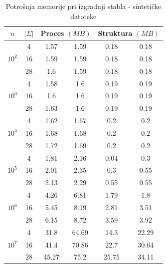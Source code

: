 \documentclass[times, utf8, seminar, numeric]{fer}
\begin{document}
  
\begin{table}[h]
\caption{Potrošnja memorije pri izgradnji stabla - sintetičke datoteke}
\label{table:mem_sin}
\centering
  \begin{tabular}{c|c|c|c|c|c}
    $n$ & $|\Sigma|$ &
    \multicolumn{2}{c|}{Proces $(MB)$} & \multicolumn{2}{c}{Struktura $(MB)$} \\ \hline
    \multirow{3}{*}{$10^2$}
      & \num{4} & \num{1.57} & \num{1.59} & \num{0.18} & \num{0.18} \\
      & \num{16} & \num{1.59} & \num{1.59} & \num{0.18} & \num{0.18} \\
      & \num{28} & \num{1.6} & \num{1.59} & \num{0.18} & \num{0.18} \\
    \hline
    \multirow{3}{*}{$10^3$}
      & \num{4} & \num{1.58} & \num{1.6} & \num{0.19} & \num{0.19} \\
      & \num{16} & \num{1.6} & \num{1.6} & \num{0.19} & \num{0.19} \\
      & \num{28} & \num{1.63} & \num{1.6} & \num{0.19} & \num{0.19} \\
    \hline
    \multirow{3}{*}{$10^4$}
      & \num{4} & \num{1.62} & \num{1.67} & \num{0.2} & \num{0.2} \\
      & \num{16} & \num{1.68} & \num{1.68} & \num{0.2} & \num{0.2} \\
      & \num{28} & \num{1.72} & \num{1.69} & \num{0.2} & \num{0.2} \\
    \hline
    \multirow{3}{*}{$10^5$}
      & \num{4} & \num{1.81} & \num{2.16} & \num{0.04} & \num{0.3} \\
      & \num{16} & \num{2.01} & \num{2.35} & \num{0.3} & \num{0.55} \\
      & \num{28} & \num{2.13} & \num{2.29} & \num{0.55} & \num{0.55} \\
    \hline
    \multirow{3}{*}{$10^6$}
      & \num{4} & \num{4.26} & \num{6.81} & \num{1.79} & \num{1.8} \\
      & \num{16} & \num{5.45} & \num{8.19} & \num{2.81} & \num{3.51} \\
      & \num{28} & \num{6.15} & \num{8.72} & \num{3.59} & \num{3.92} \\
    \hline
    \multirow{3}{*}{$10^7$}
      & \num{4} & \num{31.8} & \num{64.69} & \num{14.3} & \num{22.29} \\
      & \num{16} & \num{41.4} & \num{70.86} & \num{22.7} & \num{30.64} \\
      & \num{28} & \num{45.27} & \num{75.2} & \num{25.75} & \num{34.11} \\
  \end{tabular}
\end{table}
\end{document}
